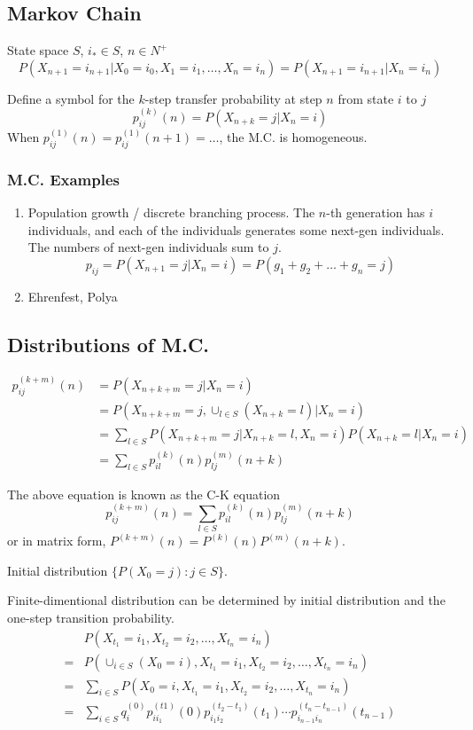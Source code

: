 \subsection{Markov Chain}

State space $S$, $i_\ast \in S$, $n\in N^+$
$$P(X_{n+1}=i_{n+1}|X_0=i_0,X_1=i_1,\ldots,X_n=i_n) = P(X_{n+1}=i_{n+1}|X_n=i_n)$$

Define a symbol for the $k$-step transfer probability at step $n$ from state $i$ to $j$
$$p_{ij}^{(k)}(n) = P(X_{n+k}=j|X_n=i)$$
When $p^{(1)}_{ij}(n)=p^{(1)}_{ij}(n+1)=\ldots$, the M.C. is homogeneous.

\subsubsection{M.C. Examples}

\begin{enumerate}
\item Population growth / discrete branching process.
The $n$-th generation has $i$ individuals, and each of the individuals generates
some next-gen individuals. The numbers of next-gen individuals sum to $j$.
$$p_{ij} = P(X_{n+1}=j|X_n=i) = P(g_1+g_2+\ldots+g_n=j)$$
\item Ehrenfest, Polya
\end{enumerate}

\subsection{Distributions of M.C.}

\begin{align}
	p_{ij}^{(k+m)}(n)
	&= P(X_{n+k+m}=j | X_n=i) \\
	&= P(X_{n+k+m}=j, \cup_{l\in S}(X_{n+k}=l) | X_n=i) \\
	&= \sum_{l\in S} P(X_{n+k+m}=j | X_{n+k}=l, X_n=i)P(X_{n+k}=l|X_n=i) \\
	&= \sum_{l\in S} p_{il}^{(k)}(n) p_{lj}^{(m)}(n+k)
\end{align}

The above equation is known as the C-K equation
$$p_{ij}^{(k+m)}(n) = \sum_{l\in S} p_{il}^{(k)}(n) p_{lj}^{(m)}(n+k)$$
or in matrix form, $P^{(k+m)}(n) = P^{(k)}(n) P^{(m)}(n+k)$.

Initial distribution $\{P(X_0=j): j\in S\}$.

Finite-dimentional distribution can be determined by initial distribution and
the one-step transition probability.
\begin{align}
	& P(X_{t_1}=i_1, X_{t_2}=i_2, \ldots, X_{t_n}=i_n)\\
	=& P(\cup_{i\in S}(X_0=i), X_{t_1}=i_1, X_{t_2}=i_2, \ldots, X_{t_n}=i_n)\\
	=& \sum_{i\in S} P(X_0=i, X_{t_1}=i_1, X_{t_2}=i_2, \ldots, X_{t_n}=i_n)\\
	=& \sum_{i\in S} q^{(0)}_i p_{ii_1}^{(t1)}(0) p_{i_1i_2}^{(t_2-t_1)}(t_1)
	   \cdots p_{i_{n-1}i_n}^{(t_n-t_{n-1})}(t_{n-1})
\end{align}


